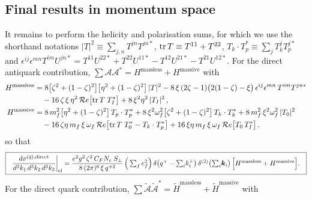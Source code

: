\documentclass[11pt,a4paper]{article}
\newcommand{\Spe}{S_{\perp}}
\newcommand{\vk}{\bm{k}}
\numberwithin{equation}{section}
\begin{document}
\subsection{Final results in momentum space}

It remains to perform the helicity and polarisation sums, for which we use the shorthand
notations $|T|^{2}\equiv\sum_{j,n}T^{jn}T^{jn*}$, ${\rm tr}\,T\equiv T^{11}+T^{22}$,
$T_{k}\cdot T^{*}_{p}\equiv\sum_{j}T^{j}_{k}T^{j*}_{p}$ and
$\epsilon^{ij}\epsilon^{mn}T^{im}U^{jn*} = T^{11}U^{22*}+T^{22}U^{11*}-T^{12}U^{21*}
-T^{21}U^{12*}$. For the direct antiquark contribution, $\sum\mathcal{A}\mathcal{A}^{*} =
H^{\text{massless}}+H^{\text{massive}}$ with
\begin{align}
\label{eq:Hmomqbar}
H^{\text{massless}} & = 8\big[\zeta^{2}+(1-\zeta)^{2}\big]\big[\eta^{2}+(1-\zeta)^{2}\big]\,
|T|^{2}-8\,\xi\,(2\zeta-1)\big(2(1-\zeta)-\xi\big)\,
\epsilon^{ij}\epsilon^{mn}\,T^{im}T^{jn*} \notag\\
&\quad -16\,\zeta\,\xi\,\eta^{2}\,{\mathcal Re}\big[{\rm tr}\,T\;T^{*}_{I}\big]
+8\,\xi^{2}\eta^{2}\,|T_{I}|^{2}\,,\notag \\
H^{\text{massive}} & = 8\,m^{2}_{f}\big[\eta^{2}+(1-\zeta)^{2}\big]\,T_{p}\cdot T^{*}_{p}
+8\,\xi^{2}\omega^{2}_{f}\big[\zeta^{2}+(1-\zeta)^{2}\big]\,T_{k}\cdot T^{*}_{k}
+8\,m^{2}_{f}\,\xi^{2}\omega^{2}_{f}\,|T_{0}|^{2} \notag\\
&\quad -16\,\zeta\eta\,m_{f}\,\xi\,\omega_{f}\,
{\mathcal Re}\big[{\rm tr}\,T\;T^{*}_{0}-T_{k}\cdot T^{*}_{p}\big]
+16\,\xi\eta\,m_{f}\,\xi\,\omega_{f}\,{\mathcal Re}\big[T_{0}\,T^{*}_{I}\big]\,,
\end{align}
so that
\begin{align}
\label{eq:finalqbar}
\boxed{\ \ \frac{d\sigma^{(\bar q),\rm direct}}{d^{3}k_{1}\,d^{3}k_{2}\,d^{3}k_{3}}
\bigg|_{\rm el} =
\frac{e^{2}g^{2}\,\zeta^{2}\,C_{F}N_{c}\;\Spe}{8\,(2\pi)^{6}\,\xi\,q^{+2}}\,
\Big(\textstyle\sum_{f}e^{2}_{f}\Big)\,
\delta\big(q^{+}-{\textstyle\sum_i} k^{+}_{i}\big)\,
\delta^{(2)}\big({\textstyle\sum_i}\vk_{i}\big)\,
\Big[H^{\text{massless}}+H^{\text{massive}}\Big].\ \ }
\end{align}
For the direct quark contribution, $\sum\widetilde{\mathcal{A}}\widetilde{\mathcal{A}}^{*} =
\widetilde H^{\text{massless}}+\widetilde H^{\text{massive}}$ with
\end{document}
